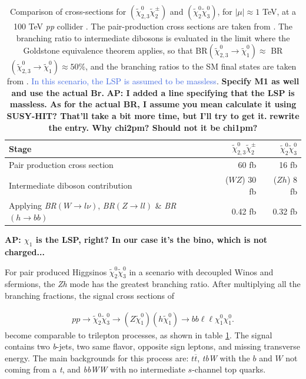 \documentclass[a4paper,11pt]{article}
\newcommand{\Shufang}[1]{{\bf\color{Maroon}  #1}}
\newcommand{\Adarsh}[1]{{\bf\color{RoyalBlue} AP: #1}}
\newcommand{\ap}[1]{\textcolor{RoyalBlue}{#1}}
\newcommand{\N}{\widetilde{\chi}^0}
\begin{document}
\begin{table}
  \centering
  \begin{tabular}{l|rr}
    \toprule
    Stage & $\N_{2,3}\widetilde{\chi}^\pm_{2}$ & $\N_2\N_3$\\
    \midrule
    Pair production cross section & 60 fb & 16 fb\\
    Intermediate diboson contribution & ($WZ$) 30 fb  & ($Zh$) 8 fb \\
    Applying \emph{BR}$(W\rightarrow l\nu)$, \emph{BR}$(Z\rightarrow ll)$ \& \emph{BR}$(h\rightarrow bb)$ & 0.42 fb & 0.32 fb\\
    \bottomrule
  \end{tabular}
  \caption{Comparison of cross-sections for
    $(\widetilde{\chi}_{2,3}^0\widetilde{\chi}^\pm_{2})$ and
    $(\N_{2}\N_{3})$, for $|\mu|\approx 1$ TeV, at a 100
    TeV \emph{pp} collider . The pair-production cross sections are taken from
    \citep{Gori:2014oua}. The branching ratio to intermediate dibosons is
    evaluated in the limit where the Goldstone equivalence theorem applies, so
    that BR$(\widetilde{\chi}_{2,3}^0\rightarrow\widetilde{\chi}_{1}^0)\approx$
    BR$(\widetilde{\chi}_{2,3}^0\rightarrow\widetilde{\chi}_1^0)\approx 50\% $,
    and the branching ratios to the SM final states are taken from
    \citep{Olive:2016xmw}. \ap{In this scenario, the LSP is assumed to be
    massless}.
    \Shufang{Specify M1 as well and use the actual Br.} \Adarsh{I added a line
  specifying that the LSP is massless. As for the actual BR, I assume you mean
  calculate it using SUSY-HIT? That'll take a bit more time, but I'll try to
  get it.}\Shufang{rewrite the entry.  Why chi2pm? Should not it be chi1pm?}}
  \Adarsh{$\chi_1$ is the LSP, right? In our case it's the bino, which is not
  charged...}
  \label{tab:xsections}
\end{table}


For pair produced Higgsinos $\tilde\chi_2^0\tilde\chi_3^0$ in a scenario with
decoupled Winos and  sfermions, the \emph{Zh} mode has the greatest
branching ratio.  After multiplying all the branching fractions, the signal cross
sections of 

\begin{align}
pp\rightarrow \widetilde{\chi}_{2}^{0}\widetilde{\chi}_{3}^{0}\rightarrow
(Z\widetilde{\chi}_1^{0})(h\widetilde{\chi}_1^{0})\rightarrow
bb\ell\ell \chi_1^0\chi_1^0.
\end{align}
become comparable  to trilepton processes, as shown in    table \ref{tab:xsections}.    The signal contains two
\emph{b}-jets, two same flavor, opposite sign leptons, and missing transverse
energy. The main backgrounds for this process are: $t\overline{t}$, \emph{tbW} with
the $b$ and $W$ not coming from a \emph{t}, and \emph{bbWW} with no intermediate
$s$-channel top quarks.  
\end{document}
